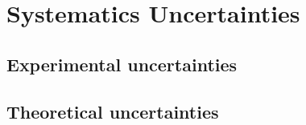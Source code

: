 \chapter{Systematics Uncertainties}
\label{chapter:systematics_uncertainties}

\section{Experimental uncertainties}
\section{Theoretical uncertainties}
